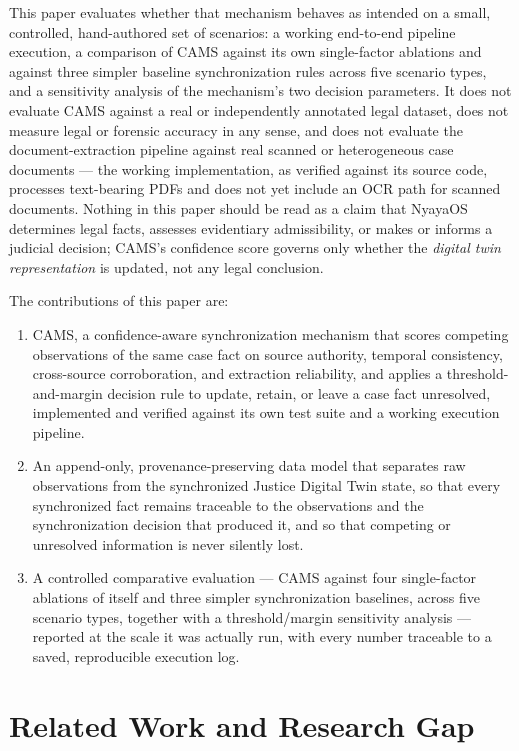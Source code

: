 \documentclass[conference]{IEEEtran}
\begin{document}
This paper evaluates whether that mechanism behaves as intended on a small,
controlled, hand-authored set of scenarios: a working end-to-end pipeline
execution, a comparison of CAMS against its own single-factor ablations and
against three simpler baseline synchronization rules across five scenario
types, and a sensitivity analysis of the mechanism's two decision
parameters. It does not evaluate CAMS against a real or independently
annotated legal dataset, does not measure legal or forensic accuracy in any
sense, and does not evaluate the document-extraction pipeline against real
scanned or heterogeneous case documents --- the working implementation, as
verified against its source code, processes text-bearing PDFs and does not
yet include an OCR path for scanned documents. Nothing in this paper should
be read as a claim that NyayaOS determines legal facts, assesses evidentiary
admissibility, or makes or informs a judicial decision; CAMS's confidence
score governs only whether the \emph{digital twin representation} is
updated, not any legal conclusion.

The contributions of this paper are:

\begin{enumerate}
\item CAMS, a confidence-aware synchronization mechanism that scores
competing observations of the same case fact on source authority, temporal
consistency, cross-source corroboration, and extraction reliability, and
applies a threshold-and-margin decision rule to update, retain, or leave a
case fact unresolved, implemented and verified against its own test suite
and a working execution pipeline.
\item An append-only, provenance-preserving data model that separates raw
observations from the synchronized Justice Digital Twin state, so that
every synchronized fact remains traceable to the observations and the
synchronization decision that produced it, and so that competing or
unresolved information is never silently lost.
\item A controlled comparative evaluation --- CAMS against four
single-factor ablations of itself and three simpler synchronization
baselines, across five scenario types, together with a threshold/margin
sensitivity analysis --- reported at the scale it was actually run, with
every number traceable to a saved, reproducible execution log.
\end{enumerate}

\section{Related Work and Research Gap}
\end{document}
